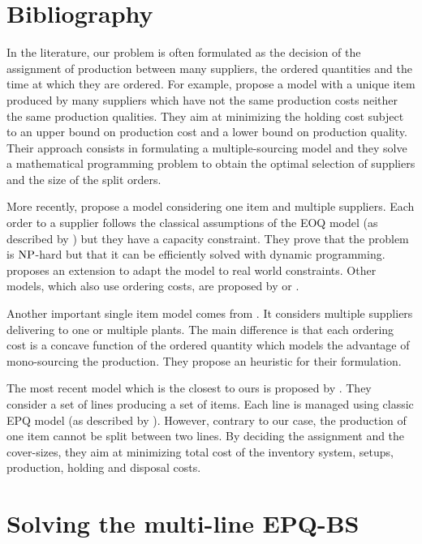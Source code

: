 \section{Bibliography}



In the literature, our problem is often formulated as the decision of the assignment of production between many suppliers, the ordered quantities and the time at which they are ordered.
For example, \citet{Hong1992} propose a model with a unique item produced by many suppliers which have not the same production costs neither the same production qualities.
They aim at minimizing the holding cost subject to an upper bound on production cost and a lower bound on production quality.
Their approach consists in formulating a multiple-sourcing model and they solve a mathematical programming problem to obtain the optimal selection of suppliers and the size of the split orders.


More recently, \citet{Rosenblatt1998} propose a model considering one item and multiple suppliers.
Each order to a supplier follows the classical assumptions of the EOQ model (as described by \citet{Harris1913}) but they have a capacity constraint.
They prove that the problem is $\operatorname{NP}$-hard but that it can be efficiently solved with dynamic programming.
\citet{Chang2006} proposes an extension to adapt the model to real world constraints.
Other models, which also use ordering costs, are proposed by \citet{Kim2005} or \citet{Park2006}.


Another important single item model comes from \citet{Chauhan2003}.
It considers multiple suppliers delivering to one or multiple plants.
The main difference is that each ordering cost is a concave function of the ordered quantity which models the advantage of mono-sourcing the production.
They propose an heuristic for their formulation.


The most recent model which is the closest to ours is proposed by \citet{Nobil2016}.
They consider a set of lines producing a set of items.
Each line is managed using classic EPQ model (as described by \citet{Taft1918}).
However, contrary to our case, the production of one item cannot be split between two lines.
By deciding the assignment and the cover-sizes, they aim at minimizing total cost of the inventory system, setups, production, holding and disposal costs.





\section{Solving the multi-line EPQ-BS}


